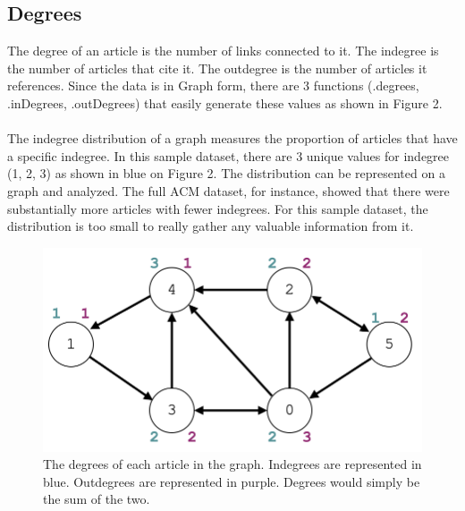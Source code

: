 \documentclass[journal]{IEEEtran}
\begin{document}
\subsection{Degrees}
The degree of an article is the number of links connected to it. The indegree is the number of articles that cite it. The outdegree is the number of articles it references. Since the data is in Graph form, there are 3 functions (.degrees, .inDegrees, .outDegrees) that easily generate these values as shown in Figure 2.\\\\
The indegree distribution of a graph measures the proportion of articles that have a specific indegree. In this sample dataset, there are 3 unique values for indegree (1, 2, 3) as shown in blue on Figure 2. The distribution can be represented on a graph and analyzed. The full ACM dataset, for instance, showed that there were substantially more articles with fewer indegrees. For this sample dataset, the distribution is too small to really gather any valuable information from it.\\
\begin{figure}[h!]
\begin{center}\includegraphics[scale=0.2]{2.png}\end{center}
\caption{The degrees of each article in the graph. Indegrees are represented in blue. Outdegrees are represented in purple. Degrees would simply be the sum of the two.}
\end{figure}
\end{document}
